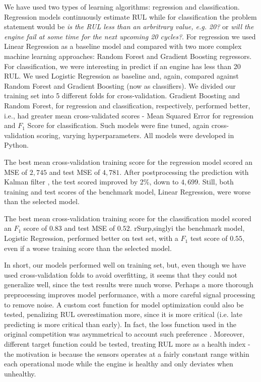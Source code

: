 \documentclass[letterpaper, 10 pt, conference, onecolumn]{ieeeconf}  %
\begin{document}
We have used two types of learning algorithms: regression and classification. Regression models continuously estimate RUL while for classification the problem statement would be \textit{is the RUL less than an arbritrary value, e.g. 20?} or \textit{will the engine fail at some time for the next upcoming 20 cycles?}. For regression we used Linear Regression as a baseline model and compared with two more complex machine learning approaches: Random Forest and Gradient Boosting regressors. For classification, we were interesting in predict if an engine has less than 20 RUL. We used Logistic Regression as baseline and, again, compared against Random Forest and Gradient Boosting (now as classifiers). We divided our training set into 5 different folds for cross-validation. Gradient Boosting and Random Forest, for regression and classification, respectively, performed better, i.e., had greater mean cross-validated scores - Mean Squared Error for regression and $F_1$ Score for classification. Such models were fine tuned, again cross-validation scoring, varying hyperparameters. All models were developed in Python.

The best mean cross-validation training score for the regression model scored an MSE of $2,745$ and test MSE of $4,781$. After postprocessing the prediction with Kalman filter \cite{h2oai}, the test scored improved by 2\%, down to $4,699$. Still, both training and test scores of the benchmark model, Linear Regression, were worse than the selected model.

The best mean cross-validation training score for the classification model scored an $F_1$ score of $0.83$ and test MSE of $0.52$. rSurp,singlyi the benchmark model, Logistic Regression, performed better on test set, with a $F_1$ test score of $0.55$, even if a worse training score than the selected model.

In short, our models performed well on training set, but, even though we have used cross-validation folds to avoid overfitting, it seems that they could not generalize well, since the test results were much worse. Perhaps a more thorough preprocessing improves model performance, with a more careful signal processing to remove noise. A custom cost function for model optimization could also be tested, penalizing RUL overestimation more, since it is more critical (i.e. late predicting is more critical than early). In fact, the loss function used in the original competition was asymmetrical to account such preference  \cite{saxena2008damage}. Moreover, different target function could be tested, treating RUL more as a health index - the motivation is because the sensors operates at a fairly constant range within each operational mode while the engine is healthy and only deviates when unhealthy.
\end{document}
